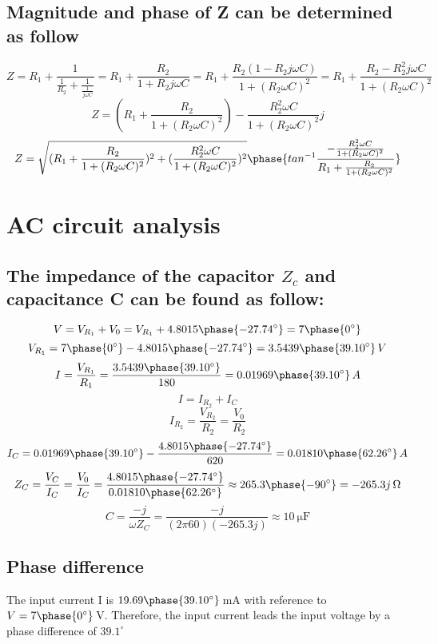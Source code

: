 \documentclass{article}
\begin{document}
\subsection{Magnitude and phase of Z can be determined as follow}
$$Z=R_1+\frac{1}{\frac{1}{R_2}+\frac{1}{\frac{1}{j\omega C}}}=R_1+\frac{R_2}{1+R_2j\omega C}=R_1+\frac{R_2(1-R_2j\omega C)}{1+(R_2\omega C)^2}=R_1+\frac{R_2-R_2^2j\omega C}{1+(R_2\omega C)^2}$$
$$Z=(R_1+\frac{R_2}{1+(R_2\omega C)^2})-\frac{R_2^2\omega C}{1+(R_2\omega C)^2}j$$
$$Z=\sqrt{(R_1+\frac{R_2}{1+(R_2\omega C)^2})^2+(\frac{R_2^2\omega C}{1+(R_2\omega C)^2})^2}\phase{tan^{-1}\frac{-\frac{R_2^2\omega C}{1+(R_2\omega C)^2}}{R_1+\frac{R_2}{1+(R_2\omega C)^2}}}$$

\section{AC circuit analysis}
\subsection{The impedance of the capacitor $Z_c$ and capacitance C can be found as follow:}
$$V=V_{R_1}+V_0=V_{R_1}+4.8015\phase{-27.74^{\circ}}=7\phase{0^{\circ}}$$
$$V_{R_1}=7\phase{0^{\circ}}-4.8015\phase{-27.74^{\circ}}=3.5439\phase{39.10^{\circ}}\,V$$
$$I=\frac{V_{R_1}}{R_1}=\frac{3.5439{\phase{39.10^{\circ}}}}{180}=0.01969\phase{39.10^{\circ}}\,A$$
$$I=I_{R_2}+I_{C}$$
$$I_{R_2}=\frac{V_{R_2}}{R_2}=\frac{V_0}{R_2}$$
$$I_C=0.01969\phase{39.10^{\circ}}-\frac{4.8015\phase{-27.74^{\circ}}}{620}=0.01810\phase{62.26^{\circ}}\,A$$
$$Z_C=\frac{V_{C}}{I_{C}}=\frac{V_{0}}{I_{C}}=\frac{4.8015\phase{-27.74^{\circ}}}{0.01810\phase{62.26^{\circ}}}\approx265.3\phase{-90^{\circ}}=-265.3j\,\Omega$$
$$C=\frac{-j}{\omega Z_C}=\frac{-j}{(2\pi 60)(-265.3j)}\approx\SI{10}{\micro\farad}$$
\subsection{Phase difference}
The input current I is $19.69\phase{39.10^{\circ}}$\,mA with reference to $V=7\phase{0^{\circ}}$\,V. Therefore, the input current leads the input voltage by a phase difference of $39.1^{\circ}$
\end{document}
